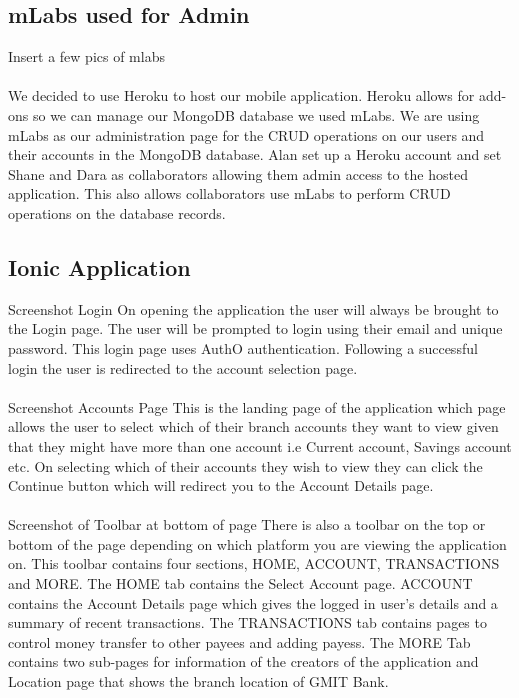 \subsection{mLabs used for Admin}
Insert a few pics of mlabs\paragraph{}
We decided to use Heroku to host our mobile application. Heroku allows for add-ons so we can manage our MongoDB database we used mLabs. We are using mLabs as our administration page for the CRUD operations on our users and their accounts in the MongoDB database. Alan set up a Heroku account and set Shane and Dara as collaborators allowing them admin access to the hosted application. This also allows collaborators use mLabs to perform CRUD operations on the database records.


\subsection{Ionic Application}

Screenshot Login
On opening the application the user will always be brought to the Login page. The user will be prompted to login using their email and unique password. This login page uses AuthO authentication. Following a successful login the user is redirected to the account selection page.\paragraph{}

Screenshot Accounts Page
 This is the landing page of the application which page allows the user to select which of their branch accounts they want to view given that they might have more than one account i.e Current account, Savings account etc. On selecting which of their accounts they wish to view they can click the Continue button which will redirect you to the Account Details page.\paragraph{}

Screenshot of Toolbar at bottom of page
 There is also a toolbar on the top or bottom of the page depending on which platform you are viewing the application on. This toolbar contains four sections, HOME, ACCOUNT, TRANSACTIONS and MORE. The HOME tab contains the Select Account page. ACCOUNT contains the Account Details page which gives the logged in user’s details and a summary of recent transactions. The TRANSACTIONS tab contains pages to control money transfer to other payees and adding payess. The MORE Tab contains two sub-pages for information of the creators of the application and Location page that shows the branch location of GMIT Bank.\paragraph{}

